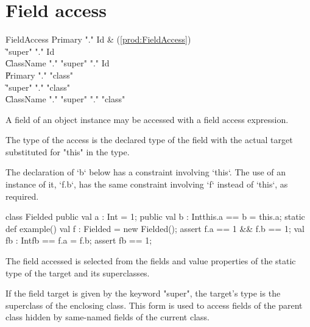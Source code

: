 \section{Field access}
\label{FieldAccess}

\begin{bbgrammar}
         FieldAccess \: Primary \xcd"." Id & (\ref{prod:FieldAccess}) \\
                     \| \xcd"super" \xcd"." Id \\
                     \| ClassName \xcd"." \xcd"super"  \xcd"." Id \\
                     \| Primary \xcd"." \xcd"class"  \\
                     \| \xcd"super" \xcd"." \xcd"class"  \\
                     \| ClassName \xcd"." \xcd"super"  \xcd"." \xcd"class"  \\
\end{bbgrammar}

A field of an object instance may be  accessed
with a field access expression.

The type of the access is the declared type of the field with the
actual target substituted for \xcd"this" in the type. 

\begin{ex}
The declaration of \xcd`b` below has a constraint involving \xcd`this`.  
The use of an instance of it, \xcd`f.b`, has the same constraint involving
\xcd`f` instead of \xcd`this`, as required.
\begin{xten}
class Fielded {
  public val a : Int = 1;
  public val b : Int{this.a == b} = this.a;
  static def example() {
    val f : Fielded = new Fielded();
    assert f.a == 1 && f.b == 1;
    val fb : Int{fb == f.a} = f.b;
    assert fb == 1;
  }
}
\end{xten}

\end{ex}

The field accessed is selected from the fields and value properties
of the static type of the target and its superclasses.

If the field target is given by the keyword \xcd"super", the target's type is
the superclass of the enclosing class.  This form is used to access fields of
the parent class hidden by same-named fields of the current class.

